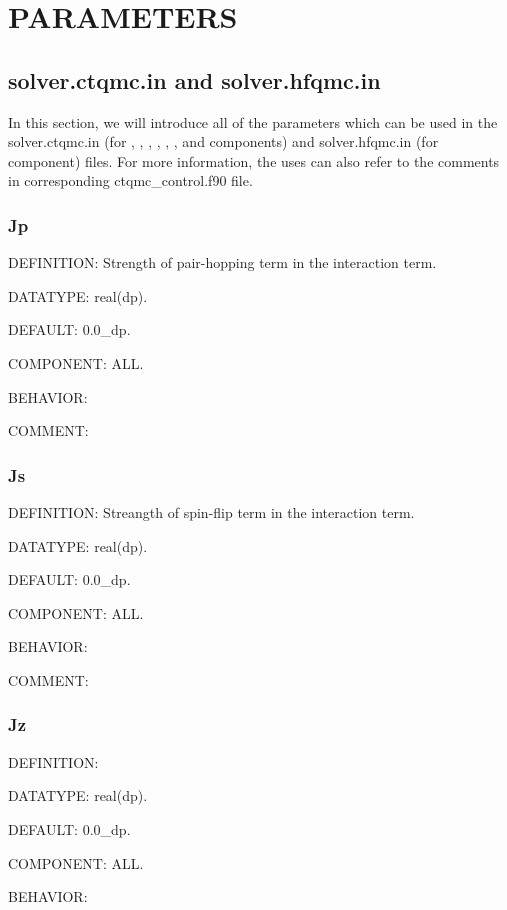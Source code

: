 \chapter{PARAMETERS}
\section{solver.ctqmc.in and solver.hfqmc.in}

In this section, we will introduce all of the parameters which can be used in the solver.ctqmc.in (for {\azalea}, {\gardenia}, {\narcissus}, {\begonia}, {\lavender}, {\pansy}, and {\manjushaka} components) and solver.hfqmc.in (for {\daisy} component) files. For more information, the uses can also refer to the comments in corresponding ctqmc\_control.f90 file.

\subsection{Jp}
{\color{red}DEFINITION:} Strength of pair-hopping term in the interaction term.

{\color{green}DATATYPE:} real(dp).

{\color{blue}DEFAULT:} 0.0\_dp.

{\color{brown}COMPONENT:} ALL.

{\color{purple}BEHAVIOR:}

{\color{olive}COMMENT:}

\subsection{Js}
{\color{red}DEFINITION:} Streangth of spin-flip term in the interaction term.

{\color{green}DATATYPE:} real(dp).

{\color{blue}DEFAULT:} 0.0\_dp.

{\color{brown}COMPONENT:} ALL.

{\color{purple}BEHAVIOR:}

{\color{olive}COMMENT:}

\subsection{Jz}
{\color{red}DEFINITION:}

{\color{green}DATATYPE:} real(dp).

{\color{blue}DEFAULT:} 0.0\_dp.

{\color{brown}COMPONENT:} ALL.

{\color{purple}BEHAVIOR:}

